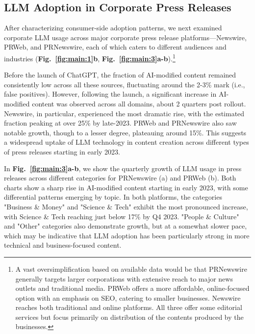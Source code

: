 \subsection*{LLM Adoption in Corporate Press Releases}
After characterizing consumer-side adoption patterns, we next examined corporate LLM usage across major corporate press release platforms---Newswire, PRWeb, and PRNewswire, each of which caters to different audiences and industries (\textbf{Fig.~\ref{fig:main:1}b}, \textbf{Fig.~\ref{fig:main:3}a-b}).\footnote{A vast oversimplification based on available data would be that PRNewswire generally targets larger corporations with extensive reach to major news outlets and traditional media. PRWeb offers a more affordable, online-focused option with an emphasis on SEO, catering to smaller businesses. Newswire reaches both traditional and online platforms. All three offer some editorial services but focus primarily on distribution of the contents produced by the businesses.}


Before the launch of ChatGPT, the fraction of AI-modified content remained consistently low across all these sources, fluctuating around the 2-3\% mark (i.e., false positives). However, following the launch, a significant increase in AI-modified content was observed across all domains, about 2 quarters post rollout. Newswire, in particular, experienced the most dramatic rise, with the estimated fraction peaking at over 25\% by late-2023. PRWeb and PRNewswire also saw notable growth, though to a lesser degree, plateauing around 15\%. This suggests a widespread uptake of LLM technology in content creation across different types of press releases starting in early 2023.

In \textbf{Fig.~\ref{fig:main:3}a-b}, we show the quarterly growth of LLM usage in press releases across different categories for PRNewswire (a) and PRWeb (b). Both charts show a sharp rise in AI-modified content starting in early 2023, with some differential patterns emerging by topic. In both platforms, the categories "Business \& Money" and "Science \& Tech" exhibit the most pronounced increase, with Science \& Tech reaching just below 17\% by Q4 2023. "People \& Culture" and "Other" categories also demonstrate growth, but at a somewhat slower pace, which may be indicative that LLM adoption has been particularly strong in more technical and business-focused content. 



